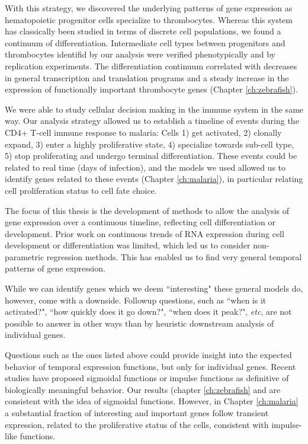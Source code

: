With this strategy, we discovered the underlying patterns of gene expression as hematopoietic progenitor cells specialize to thrombocytes. Whereas this system has classically been studied in terms of discrete cell populations, we found a continuum of differentiation. Intermediate cell types between progenitors and thrombocytes identifid by our analysis were verified phenotypically and by replication experiments. The differentiation continuum correlated with decreases in general transcription and translation programs and a steady increase in the expression of functionally important thrombocyte genes (Chapter \ref{ch:zebrafish}).

We were able to study cellular decision making in the immune system in the same way. Our analysis strategy allowed us to establish a timeline of events during the CD4+ T-cell immune response to malaria: Cells 1) get activated, 2) clonally expand, 3) enter a highly proliferative state, 4) specialize towards sub-cell type, 5) stop proliferating and undergo terminal differentiation. These events could be related to real time (days of infection), and the models we used allowed us to identify genes related to these events (Chapter \ref{ch:malaria}), in particular relating cell proliferation status to cell fate choice.

The focus of this thesis is the development of methods to allow the analysis of gene expression over a continuous timeline, reflecting cell differentiation or development. Prior work on continuous trends of RNA expression during cell development or differentiation was limited, which led us to consider non-parametric regression methods. This has enabled us to find very general temporal patterns of gene expression.

While we can identify genes which we deem ``interesting" these general models do, however, come with a downside. Followup questions, such as ``when is it activated?", ``how quickly does it go down?", ``when does it peak?", \textit{etc}, are not possible to answer in other ways than by heuristic downstream analysis of individual genes.

Questions such as the ones listed above could provide insight into the expected behavior of temporal expression functions, but only for individual genes. Recent studies have proposed sigmoidal functions \cite{Campbell2016-bd} or impulse functions \cite{Sander2016-by} as definitive of biologically meaningful behavior. Our results  (chapter \ref{ch:zebrafish} and \citet{Eckersley-Maslin2016-cz} are consistent with the idea of sigmoidal functions. However, in Chapter \ref{ch:malaria} a substantial fraction of interesting and important genes follow transient expression, related to the proliferative status of the cells, consistent with impulse-like functions.

